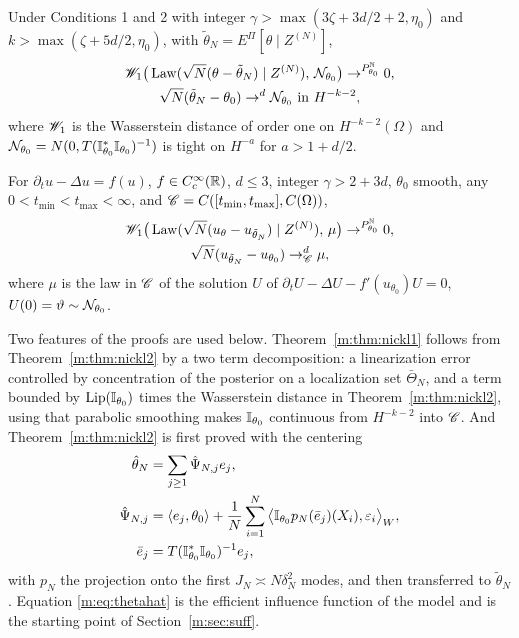 \begin{theorem}\label{m:thm:nickl2}
Under Conditions 1 and 2 with integer $\gamma>\max(3\zeta+3d/2+2,\eta_0)$ and $k>\max(\zeta+5d/2,\eta_0)$, with $\tilde\theta_N=E^\Pi[\theta\mid Z^{(N)}]$,
\begin{gather*}
\mathscr{W}_1\big(\operatorname{Law}(\sqrt N(\theta-\tilde\theta_N)\mid Z^{(N)}),\,\mathcal{N}_{\theta_0}\big)\to^{P^{\mathbb{N}}_{\theta_0}}0,\\
\sqrt N(\tilde\theta_N-\theta_0)\to^d\mathcal{N}_{\theta_0}\ \text{in }H^{-k-2},
\end{gather*}
where $\mathscr{W}_1$ is the Wasserstein distance of order one on $H^{-k-2}(\Omega)$ and $\mathcal{N}_{\theta_0}=N(0,T(\mathbb{I}_{\theta_0}^*\mathbb{I}_{\theta_0})^{-1})$ is tight on $H^{-a}$ for $a>1+d/2$.
\end{theorem}

\begin{theorem}\label{m:thm:nickl1}
For $\partial_tu-\Delta u=f(u)$, $f\in C_c^\infty(\mathbb{R})$, $d\le3$, integer $\gamma>2+3d$, $\theta_0$ smooth, any $0<t_{\min}<t_{\max}<\infty$, and $\mathscr{C}=C([t_{\min},t_{\max}],C(\Omega))$,
\begin{gather*}
\mathscr{W}_1\big(\operatorname{Law}(\sqrt N(u_\theta-u_{\tilde\theta_N})\mid Z^{(N)}),\,\mu\big)\to^{P^{\mathbb{N}}_{\theta_0}}0,\\
\sqrt N(u_{\tilde\theta_N}-u_{\theta_0})\to^d_{\mathscr{C}}\mu,
\end{gather*}
where $\mu$ is the law in $\mathscr{C}$ of the solution $U$ of $\partial_tU-\Delta U-f'(u_{\theta_0})U=0$, $U(0)=\vartheta\sim\mathcal{N}_{\theta_0}$.
\end{theorem}

Two features of the proofs are used below. Theorem~\ref{m:thm:nickl1} follows from Theorem~\ref{m:thm:nickl2} by a two term decomposition: a linearization error controlled by concentration of the posterior on a localization set $\bar\Theta_N$, and a term bounded by $\operatorname{Lip}(\mathbb{I}_{\theta_0})$ times the Wasserstein distance in Theorem~\ref{m:thm:nickl2}, using that parabolic smoothing makes $\mathbb{I}_{\theta_0}$ continuous from $H^{-k-2}$ into $\mathscr{C}$. And Theorem~\ref{m:thm:nickl2} is first proved with the centering
\begin{equation}\label{m:eq:thetahat}
\begin{aligned}
\hat\theta_N&=\sum_{j\ge1}\hat\Psi_{N,j}e_j,\\
\hat\Psi_{N,j}&=\langle e_j,\theta_0\rangle+\frac1N\sum_{i=1}^N\big\langle\mathbb{I}_{\theta_0}p_N(\bar e_j)(X_i),\varepsilon_i\big\rangle_W,\\
\bar e_j&=T(\mathbb{I}_{\theta_0}^*\mathbb{I}_{\theta_0})^{-1}e_j,
\end{aligned}
\end{equation}
with $p_N$ the projection onto the first $J_N\asymp N\delta_N^2$ modes, and then transferred to $\tilde\theta_N$. Equation \eqref{m:eq:thetahat} is the efficient influence function of the model and is the starting point of Section~\ref{m:sec:suff}.

